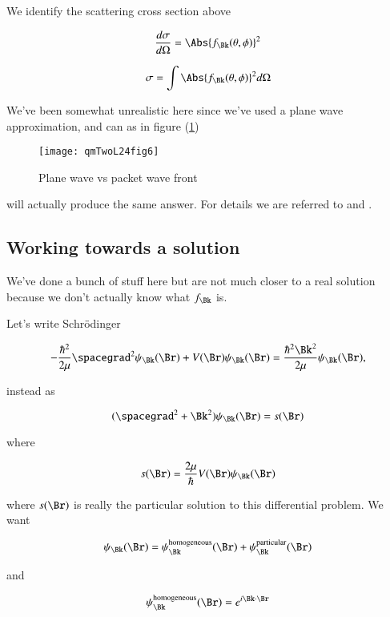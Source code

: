 We identify the scattering cross section above

\begin{equation}\label{eqn:qmTwoL24:250}
\frac{d\sigma}{d\Omega}
=
\Abs{f_\Bk(\theta, \phi)}^2
\end{equation}

\begin{equation}\label{eqn:qmTwoL24:270}
\sigma = \int \Abs{f_\Bk(\theta, \phi)}^2 d\Omega
\end{equation}

We've been somewhat unrealistic here since we've used a plane wave approximation, and can as in figure (\ref{fig:qmTwoL24:qmTwoL24fig6})

\begin{figure}[htp]
   \centering
   \texttt{[image: qmTwoL24fig6]}
   \caption{Plane wave vs packet wave front}\label{fig:qmTwoL24:qmTwoL24fig6}
\end{figure}

will actually produce the same answer.  For details we are referred to \cite{messiah1999quantum} and \cite{taylor1972scattering}.

\subsection{Working towards a solution}

We've done a bunch of stuff here but are not much closer to a real solution because we don't actually know what $f_\Bk$ is.

Let's write Schr\"{o}dinger

\begin{equation}\label{eqn:qmTwoL24:290}
-\frac{\hbar^2}{2\mu} \spacegrad^2
\psi_\Bk(\Br)
+ V(\Br)
\psi_\Bk(\Br)
=
\frac{\hbar^2 \Bk^2}{2 \mu}
\psi_\Bk(\Br),
\end{equation}

instead as

\begin{equation}\label{eqn:qmTwoL24:310}
(\spacegrad^2 + \Bk^2)
\psi_\Bk(\Br)
= s(\Br)
\end{equation}

where

\begin{equation}\label{eqn:qmTwoL24:330}
s(\Br) = \frac{2\mu}{\hbar} V(\Br) \psi_\Bk(\Br)
\end{equation}

where $s(\Br)$ is really the particular solution to this differential problem.   We want

\begin{equation}\label{eqn:qmTwoL24:350}
\psi_\Bk(\Br) =
\psi_\Bk^{\text{homogeneous}}(\Br)
+ \psi_\Bk^{\text{particular}}(\Br)
\end{equation}

and

\begin{equation}\label{eqn:qmTwoL24:370}
\psi_\Bk^{\text{homogeneous}}(\Br) = e^{i \Bk \cdot \Br}
\end{equation}

\EndArticle
